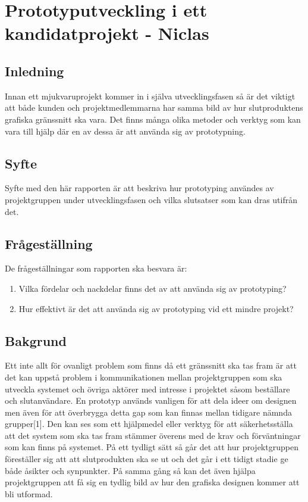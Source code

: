 \chapter{Prototyputveckling i ett kandidatprojekt - Niclas}

\section{Inledning}
Innan ett mjukvaruprojekt kommer in i själva utvecklingsfasen så är det viktigt att både kunden och projektmedlemmarna har samma bild av hur slutproduktens grafiska gränssnitt ska vara. Det finns många olika metoder och verktyg som kan vara till hjälp där en av dessa är att använda sig av prototypning.   

\section{Syfte}
Syfte med den här rapporten är att beskriva hur prototyping användes av projektgruppen under utvecklingsfasen och vilka slutsatser som kan dras utifrån det.   

\section{Frågeställning}
De frågeställningar som rapporten ska besvara är:
\begin{enumerate}
	\item Vilka fördelar och nackdelar finns det av att använda sig av prototyping?
	\item Hur effektivt är det att använda sig av prototyping vid ett mindre projekt?
\end{enumerate}

\section{Bakgrund}
Ett inte allt för ovanligt problem som finns då ett gränssnitt ska tas fram är att det kan uppstå problem i kommunikationen mellan projektgruppen som ska utveckla systemet och övriga aktörer med intresse i projektet såsom beställare och slutanvändare. En prototyp används vanligen för att dela ideer om designen men även för att överbrygga detta gap som kan finnas mellan tidigare nämnda grupper[1]. Den kan ses som ett hjälpmedel eller verktyg för att säkerhetsställa att det system som ska tas fram stämmer överens med de krav och förväntningar som kan finns på systemet. På ett tydligt sätt så går det att hur projektgruppen föreställer sig att att slutprodukten ska se ut och det går i ett tidigt stadie ge både åsikter och synpunkter. På samma gång så kan det även hjälpa projektgruppen att få sig en tydlig bild av hur den grafiska designen kommer att bli utformad.

